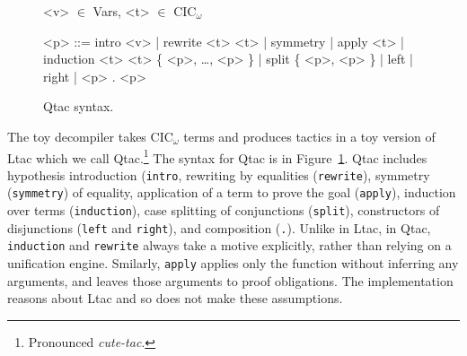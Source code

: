\begin{figure}
\small
\begin{grammar}
<v> $\in$ Vars, <t> $\in$ CIC$_{\omega}$

<p> ::= intro <v> |  rewrite <t> <t> | symmetry | apply <t> | \\
induction <t> <t> \{ <p>, \ldots, <p> \} | split \{ <p>, <p> \} | left | right | <p> . <p>
\end{grammar}
\vspace{-0.2cm}
\caption{Qtac syntax.}
\label{fig:ltacsyntax1}
\end{figure}

The toy decompiler takes CIC$_{\omega}$ terms and produces tactics in a toy version of Ltac which we call Qtac.\footnote{Pronounced \textit{cute-tac}.}
The syntax for Qtac is in Figure~\ref{fig:ltacsyntax1}.
Qtac includes hypothesis introduction (\lstinline{intro},
rewriting by equalities (\lstinline{rewrite}), symmetry (\lstinline{symmetry}) of equality,
application of a term to prove the goal (\lstinline{apply}), induction over terms (\lstinline{induction}),
case splitting of conjunctions (\lstinline{split}),
constructors of disjunctions (\lstinline{left} and \lstinline{right}), and
composition (\lstinline{.}).
Unlike in Ltac, in Qtac, \lstinline{induction} and \lstinline{rewrite} always take a motive explicitly, rather than relying on a unification engine.
Smilarly, \lstinline{apply} applies only the function without inferring any arguments, and leaves those arguments to proof obligations.
The implementation reasons about Ltac and so does not make these assumptions.

